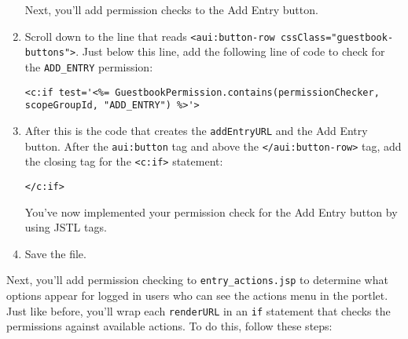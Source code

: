 \begin{enumerate}
  Next, you'll add permission checks to the Add Entry button.
\item
  Scroll down to the line that reads
  \texttt{\textless{}aui:button-row\ cssClass="guestbook-buttons"\textgreater{}}.
  Just below this line, add the following line of code to check for the
  \texttt{ADD\_ENTRY} permission:

\begin{verbatim}
<c:if test='<%= GuestbookPermission.contains(permissionChecker, scopeGroupId, "ADD_ENTRY") %>'>
\end{verbatim}
\item
  After this is the code that creates the \texttt{addEntryURL} and the
  Add Entry button. After the \texttt{aui:button} tag and above the
  \texttt{\textless{}/aui:button-row\textgreater{}} tag, add the closing
  tag for the \texttt{\textless{}c:if\textgreater{}} statement:

\begin{verbatim}
</c:if>
\end{verbatim}

  You've now implemented your permission check for the Add Entry button
  by using JSTL tags.
\item
  Save the file.
\end{enumerate}

Next, you'll add permission checking to \texttt{entry\_actions.jsp} to
determine what options appear for logged in users who can see the
actions menu in the portlet. Just like before, you'll wrap each
\texttt{renderURL} in an \texttt{if} statement that checks the
permissions against available actions. To do this, follow these steps:

